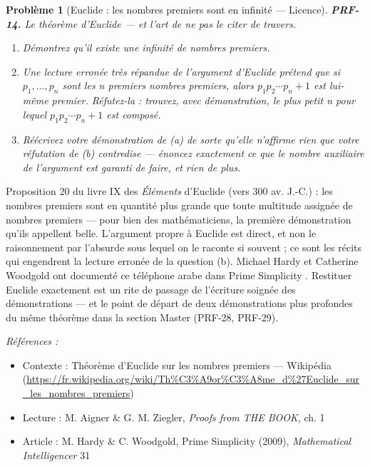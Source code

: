 \documentclass[11pt]{article}
\newtheorem{problem}{Problème}
\newenvironment{refs}{\par\small\noindent\emph{Références :}\begin{itemize}\setlength\itemsep{0pt}}{\end{itemize}\normalsize}
\begin{document}
\bigskip

\begin{problem}[{Euclide : les nombres premiers sont en infinité --- Licence}]
\textbf{PRF-14.} Le théorème d'Euclide --- et l'art de ne pas le citer de travers.
\begin{enumerate}
\item[(a)] Démontrez qu'il existe une infinité de nombres premiers.
\item[(b)] Une lecture erronée très répandue de l'argument d'Euclide prétend que si
$ p_1, \dots, p_n $ sont les n premiers nombres premiers, alors
$ p_1 p_2 \cdots p_n + 1 $ est lui-même premier. Réfutez-la : trouvez, avec démonstration,
le plus petit n pour lequel $ p_1 p_2 \cdots p_n + 1 $ est composé.
\item[(c)] Réécrivez votre démonstration de (a) de sorte qu'elle n'affirme rien que votre
réfutation de (b) contredise --- énoncez exactement ce que le nombre auxiliaire de l'argument
est garanti de faire, et rien de plus.
\end{enumerate}

\end{problem}

\noindent Proposition 20 du livre IX des \textit{Éléments} d'Euclide (vers 300 av.
J.-C.) : \og{} les nombres premiers sont en quantité plus grande que toute multitude assignée de
nombres premiers \fg{} --- pour bien des mathématiciens, la première démonstration qu'ils appellent
belle. L'argument propre à Euclide est direct, et non le raisonnement par l'absurde sous
lequel on le raconte si souvent ; ce sont les récits qui engendrent la lecture erronée de la
question (b). Michael Hardy et Catherine Woodgold ont documenté ce téléphone arabe dans
\og{} Prime Simplicity \fg{}. Restituer Euclide exactement est un rite de passage de l'écriture
soignée des démonstrations --- et le point de départ de deux démonstrations plus profondes du
même théorème dans la section Master (PRF-28, PRF-29).

\begin{refs}
\item Contexte : Théorème d'Euclide sur les nombres premiers --- Wikipédia (\url{https://fr.wikipedia.org/wiki/Th%C3%A9or%C3%A8me_d%27Euclide_sur_les_nombres_premiers})
\item Lecture : M. Aigner \& G. M. Ziegler, \textit{Proofs from THE BOOK}, ch. 1
\item Article : M. Hardy \& C. Woodgold, \og{} Prime Simplicity \fg{} (2009), \textit{Mathematical Intelligencer} 31
\end{refs}
\end{document}
